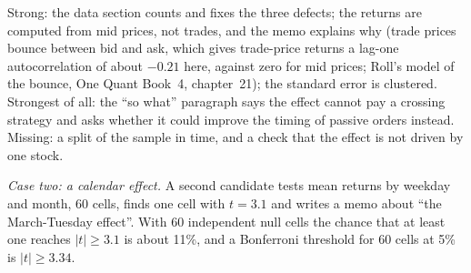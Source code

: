 \begin{omfigure}

\label{fig:iv:research-case-studies-and-take-homes:case}
\end{omfigure}

\begin{remark}\label{rem:iv:research-case-studies-and-take-homes:rev1}
Strong: the data section counts and fixes the three defects; the returns are computed from mid prices, not trades, and the
memo explains why (trade prices bounce between bid and ask, which gives trade-price returns a lag-one autocorrelation of about
$-0.21$ here, against zero for mid prices; Roll's model of the bounce, One Quant Book~4, chapter~21); the standard error is
clustered. Strongest of all: the ``so what'' paragraph says the effect cannot pay a crossing strategy and asks whether it
could improve the timing of passive orders instead. Missing: a split of the sample in time, and a check that the effect is
not driven by one stock.
\end{remark}

\emph{Case two: a calendar effect.} A second candidate tests mean returns by weekday and month, 60 cells, finds one cell with
$t = 3.1$ and writes a memo about ``the March-Tuesday effect''. With 60 independent null cells the chance that at least one
reaches $|t| \ge 3.1$ is about 11\%, and a Bonferroni threshold for 60 cells at 5\% is $|t| \ge 3.34$.

